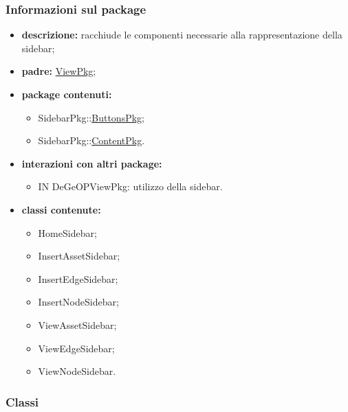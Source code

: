 \subsubsection{Informazioni sul package}
\begin{itemize}
	\item \textbf{descrizione:} racchiude le componenti necessarie alla rappresentazione della sidebar;
	\item \textbf{padre:} \hyperref[pkg::ViewPkg]{ViewPkg};
	\item \textbf{package contenuti:}
	\begin{itemize}
		\item SidebarPkg::\hyperref[pkg::ButtonsPkg]{ButtonsPkg};
		\item SidebarPkg::\hyperref[pkg::ContentPkg]{ContentPkg}.
	\end{itemize}
	\item \textbf{interazioni con altri package:} 
	\begin{itemize}
		\item IN DeGeOPViewPkg: utilizzo della sidebar.
	\end{itemize}
	\item \textbf{classi contenute:}
	\begin{itemize}
		\item HomeSidebar;
		\item InsertAssetSidebar;
		\item InsertEdgeSidebar;
		\item InsertNodeSidebar;
		\item ViewAssetSidebar;
		\item ViewEdgeSidebar;
		\item ViewNodeSidebar.
	\end{itemize}
\end{itemize}
\subsubsection{Classi}
